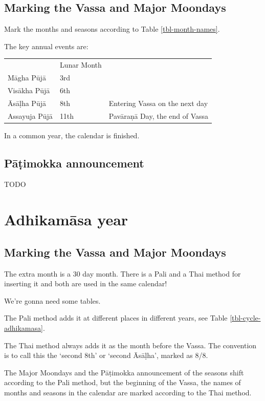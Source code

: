 \documentclass[11pt,oneside]{memoir-article}
\begin{document}
\subsection{Marking the Vassa and Major Moondays}
\label{sec-1-2-2}

Mark the months and seasons according to Table \ref{tbl-month-names}.

The key annual events are:

\begin{center}
\begin{tabular}{lll}
 & Lunar Month & \\
Māgha Pūjā & 3rd & \\
Visākha Pūjā & 6th & \\
Āsāḷha Pūjā & 8th & Entering Vassa on the next day\\
Assayuja Pūjā & 11th & Pavāraṇā Day, the end of Vassa\\
\end{tabular}
\end{center}

In a common year, the calendar is finished. 

\subsection{Pāṭimokka announcement}
\label{sec-1-2-3}

TODO

\section{Adhikamāsa year}
\label{sec-1-3}
\subsection{Marking the Vassa and Major Moondays}
\label{sec-1-3-1}

The extra month is a 30 day month. There is a Pali and a Thai method for
inserting it and both are used in the same calendar!

We're gonna need some tables.

The Pali method adds it at different places in different years, see Table
\ref{tbl-cycle-adhikamasa}.

The Thai method always adds it as the month before the Vassa. The convention is
to call this the `second 8th' or `second Āsāḷha', marked as 8/8.

The Major Moondays and the Pāṭimokka announcement of the seasons shift according
to the Pali method, but the beginning of the Vassa, the names of months and
seasons in the calendar are marked according to the Thai method.
\end{document}
